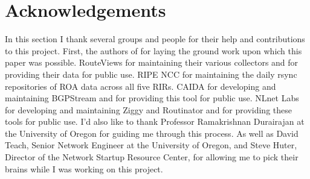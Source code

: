 \section{Acknowledgements}
In this section I thank several groups and people for their help and
contributions to this project. First, the authors of \cite{rpki-paper} for
laying the ground work upon which this paper was possible. RouteViews for
maintaining their various collectors and for providing their data for public
use. RIPE NCC for maintaining the daily rsync repositories of ROA data across
all five RIRs. CAIDA for developing and maintaining BGPStream \cite{bgpreader}
and for providing this tool for public use. NLnet Labs for developing and
maintaining Ziggy \cite{ziggy} and Routinator \cite{routinator} and for
providing these tools for public use.  I'd also like to thank Professor
Ramakrishnan Durairajan at the University of Oregon for guiding me through this
process. As well as David Teach, Senior Network Engineer at the University of
Oregon, and Steve Huter, Director of the Network Startup Resource Center, for
allowing me to pick their brains while I was working on this project.
